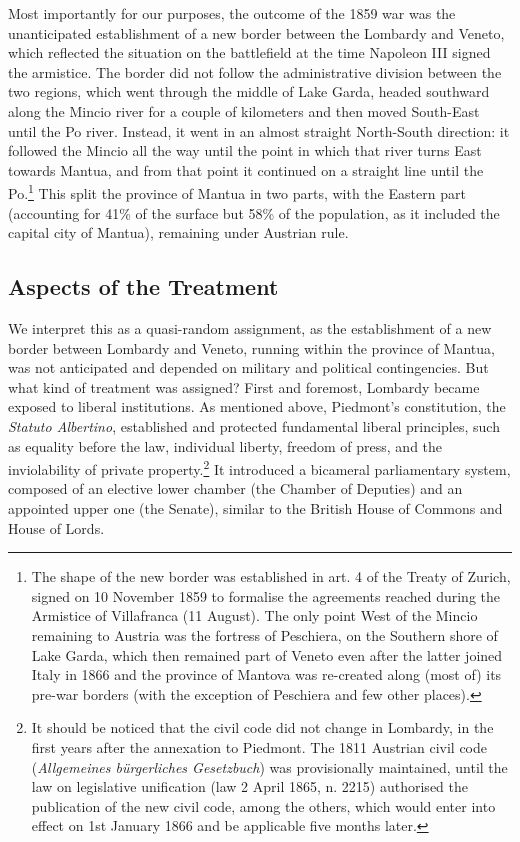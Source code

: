 Most importantly for our purposes, the outcome of the 1859 war was the unanticipated establishment of a new border between the Lombardy and Veneto, which reflected the situation on the battlefield at the time Napoleon III signed the armistice.
The border did not follow the administrative division between the two regions, which went through the middle of Lake Garda, headed southward along the Mincio river for a couple of kilometers and then moved South-East until the Po river.
Instead, it went in an almost straight North-South direction: it followed the Mincio all the way until the point in which that river turns East towards Mantua, and from that point it continued on a straight line until the Po.\footnote{The shape of the new border was established in art. 4 of the Treaty of Zurich, signed on  10 November 1859 to formalise the agreements reached during the Armistice of Villafranca (11 August). The only point West of the Mincio remaining to Austria was the fortress of Peschiera, on the Southern shore of Lake Garda, which then remained part of Veneto even after the latter joined Italy in 1866 and the province of Mantova was re-created along (most of) its pre-war borders (with the exception of Peschiera and few other places).
}
This split the province of Mantua in two parts, with the Eastern part (accounting for 41\% of the surface but 58\% of the population, as it included the capital city of Mantua), remaining under Austrian rule.

\subsection{Aspects of the Treatment}
We interpret this as a quasi-random assignment, as the establishment of a new border between Lombardy and Veneto, running within the province of Mantua, was not anticipated and depended on military and political contingencies. But what kind of treatment was assigned?
First and foremost, Lombardy became exposed to liberal institutions.
As mentioned above, Piedmont's constitution, the \textit{Statuto Albertino}, established and protected fundamental liberal principles, such as equality before the law, individual liberty, freedom of press, and the inviolability of private property.\footnote{It should be noticed that the civil code did not change in Lombardy, in the first years after the annexation to Piedmont. The 1811 Austrian civil code (\textit{Allgemeines bürgerliches Gesetzbuch}) was provisionally maintained, until the law on legislative unification (law 2 April 1865, n. 2215) authorised the publication of the new civil code, among the others, which would enter into effect on 1st January 1866 and be applicable five months later.
}
It introduced a bicameral parliamentary system, composed of an elective lower chamber (the Chamber of Deputies) and an appointed upper one (the Senate), similar to the British House of Commons and House of Lords.

